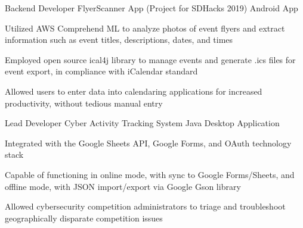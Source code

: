 

\begin{cventries}

  \cventry
    {Backend Developer} %
    {FlyerScanner App (Project for SDHacks 2019)} %
    {Android App} %
    {} %
    {
      \begin{cvitems} %
        \item {Utilized AWS Comprehend ML to analyze photos of event flyers and extract information such as event titles, descriptions, dates, and times}
        \item {Employed open source ical4j library to manage events and generate .ics files for event export, in compliance with iCalendar standard}
        \item {Allowed users to enter data into calendaring applications for increased productivity, without tedious manual entry}
      \end{cvitems}
    }
    
  \cventry
    {Lead Developer} %
    {Cyber Activity Tracking System} %
    {Java Desktop Application} %
    {} %
    {
      \begin{cvitems} %
        \item {Integrated with the Google Sheets API, Google Forms, and OAuth technology stack}
        \item {Capable of functioning in online mode, with sync to Google Forms/Sheets, and offline mode, with JSON import/export via Google Gson library}
        \item {Allowed cybersecurity competition administrators to triage and troubleshoot geographically disparate competition issues}
      \end{cvitems}
    }
    
\end{cventries}